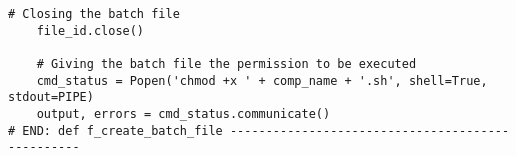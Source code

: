 \documentclass[11pt]{article}
\makeatletter
\renewcommand{\subsection}{\@startsection
{subsection}%
{1}%
{0mm}%
{0.4\baselineskip}%
{0.4\baselineskip}%
{\normalfont\large\bfseries\color{myBrown}}}%
\makeatother
\begin{document}
\begin{lstlisting}[style=BashInputStyle]
    # Closing the batch file
    file_id.close()
    
    # Giving the batch file the permission to be executed
    cmd_status = Popen('chmod +x ' + comp_name + '.sh', shell=True, stdout=PIPE)
    output, errors = cmd_status.communicate()
# END: def f_create_batch_file -------------------------------------------------
\end{lstlisting}



 
 
 
 
 
 
 
\end{document}
